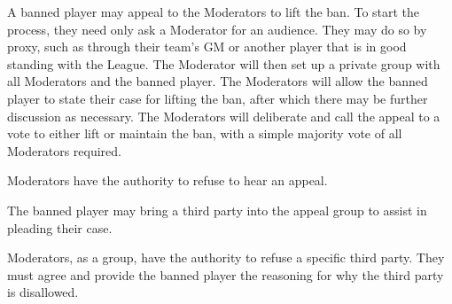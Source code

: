 \begin{deepEnumerate}
\begin{deepEnumerate}
		\item A banned player may appeal to the Moderators to lift the ban. To start the process, they need only ask a Moderator for an audience. They may do so by proxy, 
		such as through their team's GM or another player that is in good standing with the League. The Moderator will then set up a private group with all 
		Moderators and the banned player. The Moderators will allow the banned player to state their case for lifting the ban, after which there may be further discussion 
		as necessary. The Moderators will deliberate and call the appeal to a vote to either lift or maintain the ban, with a simple majority vote of all Moderators required.
		\begin{deepEnumerate}
			\item Moderators have the authority to refuse to hear an appeal.
			\item The banned player may bring a third party into the appeal group to assist in pleading their case.
			\begin{deepEnumerate}
				\item Moderators, as a group, have the authority to refuse a specific third party. 
				They must agree and provide the banned player the reasoning for why the third party is disallowed.
			\end{deepEnumerate}
		\end{deepEnumerate}
	\end{deepEnumerate}
\end{deepEnumerate}